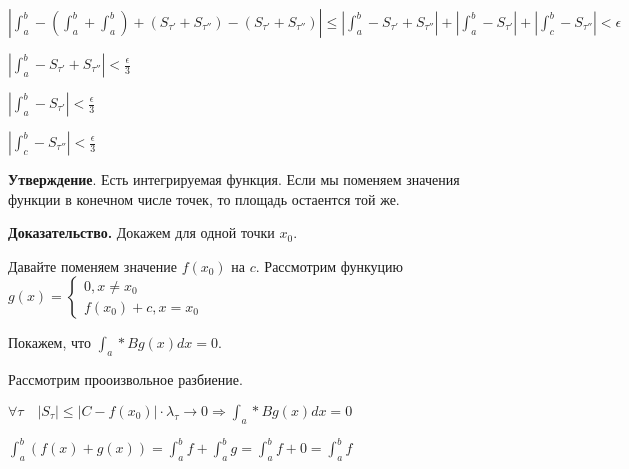 \documentclass[a4paper]{article}
\begin{document}
\begin{enumerate}
\begin{enumerate}
$\displaystyle \left| \int_a^b - \left( \int_a^b + \int_a^b \right) + \left( S_{\tau'} + S_{\tau''} \right) - (S_{\tau'} + S_{\tau''}) \right| \leq \left| \int_a^b -  S_{\tau'} + S_{\tau''} \right| + \left| \int_a^b - S_{\tau'} \right| + \left| \int_c^b - S_{\tau''} \right| <\epsilon$

$\left| \int_a^b -  S_{\tau'} + S_{\tau''} \right| < \frac{\epsilon}{3}$

$ \left| \int_a^b - S_{\tau'} \right| < \frac{\epsilon}{3}$

$\left| \int_c^b - S_{\tau''} \right| < \frac{\epsilon}{3}$
\end{enumerate}


\end{enumerate}


\begin{htheorem}\textbf{Утверждение}. Есть интегрируемая функция. Если мы поменяем значения функции в конечном числе точек, то площадь остаентся той же.

\end{htheorem}

\begin{hproof}\textbf{Доказательство.}
Докажем для одной точки $x_0$.

Давайте поменяем значение $f(x_0)$ на $c$.
Рассмотрим функуцию $g(x) = \begin{cases} 0, x \neq x_0 \\ f(x_0)+c, x=x_0 \end{cases}$

Покажем, что $\displaystyle \int_a*B g(x)dx = 0$.

Рассмотрим прооизвольное разбиение.

$\displaystyle \forall \tau \quad  |S_\tau| \leq |C - f(x_0)| \cdot \lambda_\tau \rightarrow 0 \Rightarrow \int_a*B g(x)dx = 0$

$\displaystyle \int_a^b (f(x) + g(x)) = \int_a^b f + \int_a^b g =  \int_a^b f + 0 =  \int_a^b f$

\end{hproof}
\end{document}
